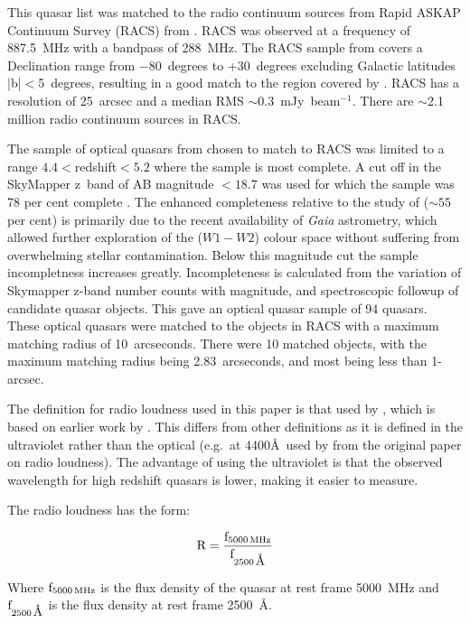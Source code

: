 \documentclass[a4paper,fleqn,usenatbib]{mnras}
\newcommand{\around}{$\sim$}
\begin{document}
This quasar list was matched to the radio continuum sources from Rapid ASKAP Continuum Survey (RACS) from \citet{hale21}.  RACS was observed at a frequency of 887.5~MHz with a bandpass of 288~MHz.  The RACS sample from \citet{hale21} covers a Declination range from $-$80~degrees to +30~degrees excluding Galactic latitudes |b|$<$5~degrees, resulting in a good match to the region covered by \citet{onken22}.  RACS has a resolution of 25~arcsec and a median RMS \around 0.3~mJy~beam$^{-1}$.  There are \around 2.1 million radio continuum sources in RACS.  

The sample of optical quasars from \citet{onken22} chosen to match to RACS was limited to a range $4.4<$redshift$<5.2$ where the sample is most complete.  A cut off in the SkyMapper z~band of AB magnitude $<18.7$ was used for which the sample was 78 per cent complete \citep{onken22}.  {The enhanced completeness relative to the study of \citet{yang16} ($\sim55$ per cent) is primarily due to the recent availability of {\it Gaia} astrometry, which allowed further exploration of the ($W1-W2$) colour space without suffering from overwhelming stellar contamination. Below this magnitude cut the sample incompletness increases greatly.  Incompleteness is calculated from the variation of Skymapper z-band number counts with magnitude, and spectroscopic followup of candidate quasar objects.} This gave an optical quasar sample of 94 quasars.  {These optical quasars were matched to the objects in RACS with a maximum matching radius of 10~arcseconds}.  There were 10 matched objects, with the maximum matching radius being 2.83~arcseconds, and most being less than 1-arcsec.    

{The definition for radio loudness used in this paper is  that used by \citet{jiang07}, which is based on  earlier work by \citet{stocke92}.  This differs from other definitions as it is defined in the ultraviolet rather than the optical (e.g.~at 4400\AA\ used {by} \citet{kellermann89} from the original paper on radio loudness).  The advantage of using the ultraviolet is that the observed wavelength for high redshift quasars  is lower, making it easier to measure.}  

The radio loudness has the form:

\begin{equation}
\rm R = \frac{f_{5000\, MHz}}{f_{2500\, \mbox{\normalfont\AA}}}
\end{equation}

Where $\rm f_{5000\, MHz}$ is the flux density of the quasar at rest frame 5000~MHz and $\rm f_{2500\, \mbox{\normalfont\AA}}$ is the flux density at rest frame 2500~\AA.
\end{document}
